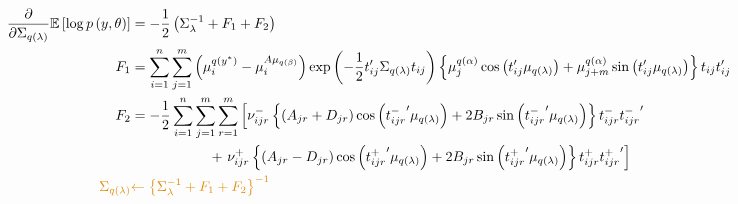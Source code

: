\documentclass[11pt]{article}
\begin{document}
\begin{align*}
  \frac{\partial}{\partial \Sigma_{q\left(\lambda\right)}} \mathbb{E}\left[\log p\left(y, \theta\right) \right] &= -\frac{1}{2}\left(\Sigma_{\lambda}^{-1} + F_{1} + F_{2} \right)\\
  F_{1} &= \sum_{i=1}^{n}\sum_{j=1}^{m} \left(\mu_{i}^{q\left(y^{*}\right)} -\mu_{i}^{A\mu_{q\left(\beta\right)}}\right)\exp\left(-\frac{1}{2}t_{ij}'\Sigma_{q\left(\lambda\right)}t_{ij}\right)\left\{\mu_{j}^{q\left(\alpha\right)}\cos \left(t_{ij}'\mu_{q\left(\lambda\right)}\right) + \mu_{j+m}^{q\left(\alpha\right)}\sin \left(t_{ij}'\mu_{q\left(\lambda\right)}\right) \right\}t_{ij}t_{ij}'\\
  F_{2} &= -\frac{1}{2}\sum_{i=1}^{n}\sum_{j=1}^{m}\sum_{r=1}^{m} \left[\nu_{ijr}^{-}\left\{\left(A_{jr}+D_{jr}\right)\cos\left({t_{ijr}^{-}}'\mu_{q\left(\lambda\right)} \right) +2B_{jr}\sin\left({t_{ijr}^{-}}'\mu_{q\left(\lambda\right)} \right) \right\}t_{ijr}^{-}{t_{ijr}^{-}}'\right.\\
  &\quad\qquad \qquad\;\; +\left. \nu_{ijr}^{+}\left\{\left(A_{jr}-D_{jr} \right)\cos\left({t_{ijr}^{+}}'\mu_{q\left(\lambda\right)} \right) +2B_{jr}\sin\left({t_{ijr}^{+}}'\mu_{q\left(\lambda\right)} \right) \right\}t_{ijr}^{+}{t_{ijr}^{+}}' \right]\\
  \textcolor{myorange}{\Sigma_{q\left(\lambda\right)}} &\textcolor{myorange}{\leftarrow \left\{\Sigma_{\lambda}^{-1} + F_{1}+F_{2} \right\}^{-1}}
\end{align*}
\end{document}
